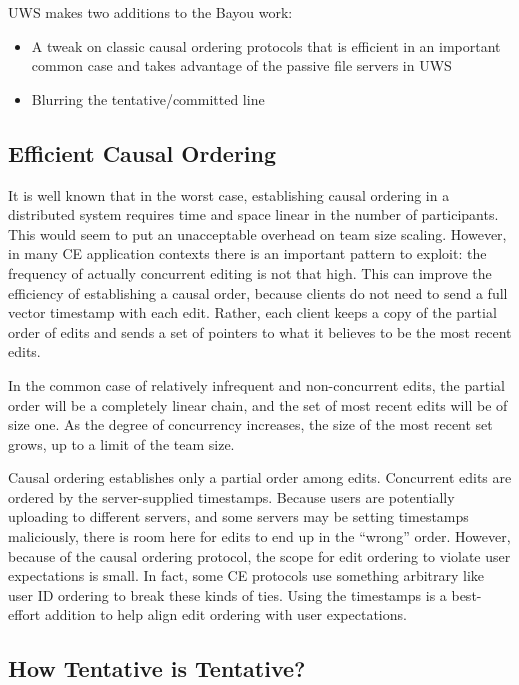 \documentclass[runningheads]{llncs}
\begin{document}
UWS makes two additions to the Bayou work:

\begin{itemize}
\item A tweak on classic causal ordering protocols that is efficient in an important common case and takes advantage of the passive file servers in UWS
\item Blurring the tentative{\slash}committed line
\end{itemize}

\subsection{Efficient Causal Ordering}

It is well known that in the worst case, establishing causal ordering in a distributed system requires time and space linear in the number of participants.
This would seem to put an unacceptable overhead on team size scaling.
However, in many CE application contexts there is an important pattern to exploit: the frequency of actually concurrent editing is not that high.
This can improve the efficiency of establishing a causal order, because clients do not need to send a full vector timestamp with each edit.
Rather, each client keeps a copy of the partial order of edits and sends a set of pointers to what it believes to be the most recent edits.

In the common case of relatively infrequent and non-concurrent edits, the partial order will be a completely linear chain, and the set of most recent edits will be of size one.
As the degree of concurrency increases, the size of the most recent set grows, up to a limit of the team size.

Causal ordering establishes only a partial order among edits.
Concurrent edits are ordered by the server-supplied timestamps.
Because users are potentially uploading to different servers, and some servers may be setting timestamps maliciously, there is room here for edits to end up in the ``wrong'' order.
However, because of the causal ordering protocol, the scope for edit ordering to violate user expectations is small.
In fact, some CE protocols use something arbitrary like user ID ordering to break these kinds of ties.
Using the timestamps is a best-effort addition to help align edit ordering with user expectations.

\subsection{How Tentative is Tentative?}
\end{document}
